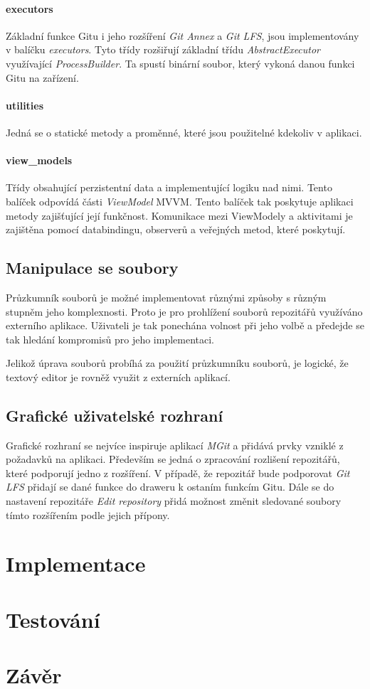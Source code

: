             \subsubsection{executors}
            Základní funkce Gitu i jeho rozšíření \emph{Git Annex} a \emph{Git LFS}, jsou implementovány v balíčku \emph{executors}. Tyto třídy rozšiřují základní třídu \emph{AbstractExecutor} využívající \emph{ProcessBuilder}. Ta spustí binární soubor, který vykoná danou funkci Gitu na zařízení.

            \subsubsection{utilities}
            Jedná se o statické metody a proměnné, které jsou použitelné kdekoliv v aplikaci. 

            \subsubsection{view\_models}
            Třídy obsahující perzistentní data a implementující logiku nad nimi. Tento balíček odpovídá části \emph{ViewModel} MVVM. Tento balíček tak poskytuje aplikaci metody zajišťující její funkčnost. Komunikace mezi ViewModely a aktivitami je zajištěna pomocí databindingu, observerů a veřejných metod, které poskytují.

    \section{Manipulace se soubory}
    Průzkumník souborů je možné implementovat různými způsoby s různým stupněm jeho komplexnosti. Proto je pro prohlížení souborů repozitářů využíváno externího aplikace. Uživateli je tak ponechána volnost při jeho volbě a předejde se tak hledání kompromisů pro jeho implementaci.

    Jelikož úprava souborů probíhá za použití průzkumníku souborů, je logické, že textový editor je rovněž využit z externích aplikací.

    \section{Grafické uživatelské rozhraní}
    Grafické rozhraní se nejvíce inspiruje aplikací \emph{MGit} a přidává prvky vzniklé z požadavků na aplikaci. Především se jedná o zpracování rozlišení repozitářů, které podporují jedno z rozšíření. V případě, že repozitář bude podporovat \emph{Git LFS} přidají se dané funkce do draweru k ostaním funkcím Gitu. Dále se do nastavení repozitáře \emph{Edit repository} přidá možnost změnit sledované soubory tímto rozšířením podle jejich přípony.

\chapter{Implementace}

\chapter{Testování}
\chapter{Závěr}